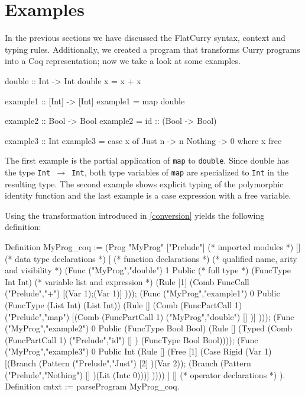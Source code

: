 \documentclass[paper = a4, fleqn, abstract=on, twoside]{scrreprt}
\begin{document}
\section{Examples}
In the previous sections we have discussed the FlatCurry syntax, context and typing rules. Additionally, we created a program that transforms Curry programs into a Coq representation; now we take a look at some examples.
\begin{flushleft}
	\begin{minipage}[t]{.4 \linewidth}
\begin{haskellcode}
double :: Int -> Int
double x = x + x

example1 :: [Int] -> [Int]
example1 = map double

example2 :: Bool -> Bool
example2 = id :: (Bool -> Bool)
\end{haskellcode}
\end{minipage}
\hfill
\vrule
\hspace{.5em}
\begin{minipage}[t]{.5 \linewidth}
\begin{haskellcode}
example3 :: Int
example3 = case x of
             Just n  -> n
             Nothing -> 0
           where x free
\end{haskellcode}
\end{minipage}
\end{flushleft}
The first example is the partial application of \texttt{map} to \texttt{double}. Since double has the type \texttt{Int $\rightarrow$ Int}, both type variables of \texttt{map} are specialized to \texttt{Int} in the resulting type. The second example shows explicit typing of the polymorphic identity function and the last example is a case expression with a free variable.
\par\noindent
Using the transformation introduced in \autoref{conversion} yields the following definition:
\begin{coqcode}
Definition MyProg_coq :=  (Prog "MyProg"
["Prelude"] (* imported modules *)
[] (* data type declarations *)
[ (* function declarations *)
      (* qualified name,  arity and visibility *)
(Func ("MyProg","double") 1         Public 
      (* full type *)
      (FuncType Int Int)
      (* variable list and expression *)
      (Rule  [1] (Comb FuncCall ("Prelude","+") [(Var 1);(Var 1)] )));
(Func ("MyProg","example1") 0  Public 
      (FuncType (List Int) (List Int))
      (Rule  [] (Comb (FuncPartCall 1) ("Prelude","map") [(Comb (FuncPartCall 1)
      ("MyProg","double") [] )] )));
(Func ("MyProg","example2") 0  Public 
      (FuncType Bool Bool)
      (Rule  [] (Typed (Comb (FuncPartCall 1) ("Prelude","id") [] )
      (FuncType Bool Bool))));
(Func ("MyProg","example3") 0  Public 
      Int
      (Rule  [] (Free  [1] (Case Rigid (Var 1) 
        [(Branch (Pattern ("Prelude","Just") [2] )(Var 2));
         (Branch (Pattern ("Prelude","Nothing") [] )(Lit (Intc 0)))] ))))
]
[] (* operator declarations *)
).
Definition cntxt := parseProgram MyProg_coq.
\end{coqcode}
\end{document}
